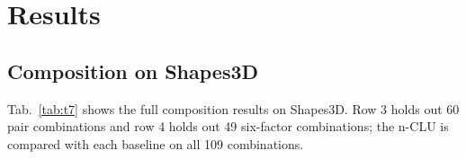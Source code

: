 \documentclass{article} %
\begin{document}
\section{Results}
\label{sec:results}

\subsection{Composition on Shapes3D}
\label{sec:shapes-t7}

Tab.~\ref{tab:t7} shows the full composition results on Shapes3D. Row 3 holds out 60 pair combinations and row 4 holds out
49 six-factor combinations; the n-CLU is compared with each baseline on all 109 combinations.
\end{document}
